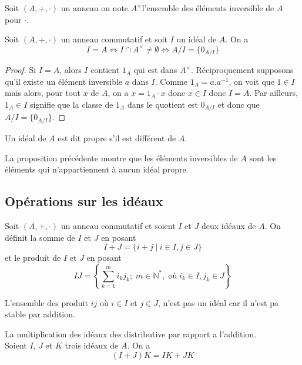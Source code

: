 Soit $(A,+,\cdot)$ un anneau on note $A^\times$l'ensemble des éléments inversible de $A$ pour $\cdot$.


    \begin{proposition}
        Soit $(A,+,\cdot)$ un anneau commutatif et soit $I$ un idéal de $A$. On a
        \[
        I=A \Leftrightarrow I\cap A^\times \neq \emptyset \Leftrightarrow A/I = \{0_{A/I}\}
        \]
    \end{proposition}
    


\begin{proof}
    Si $I=A$, alors $I$ contient $1_A$ qui est dans $A^\times$. Réciproquement supposons qu'il existe un élément inversible $a$ dans $I$. Comme $1_A=a.a^{-1}$, on voit que $1\in I$ mais alors, pour tout $x$ de $A$, on a $x=1_A\cdot x$ donc $x \in I$ donc $I=A$. Par ailleurs, $1_A\in I$ signifie que la classe de $1_A$ dans le quotient est $0_{A/I}$ et donc que $A/I=\{0_{A/I}\}$.
\end{proof}

\begin{definition}
    Un idéal de $A$ est dit propre s'il est différent de $A$.
\end{definition}
La proposition précédente montre que les éléments inversibles de $A$ sont les éléments qui n'appartiennent à aucun idéal propre.
\subsection{Opérations sur les idéaux}

    \begin{definition}
        Soit $(A,+,\cdot)$ un anneau commutatif et soient $I$ et $J$ deux idéaux de $A$. On définit la somme de $I$ et $J$ en posant 
        \[
        I+J=\{i+j\; |\:  i \in I, j\in J\}
        \]
        et le produit de $I$ et $J$ en posant
        \[
        IJ= \left\{\sum_{k=1}^m i_kj_k; \;m\in \mathbb{N}^*,\; \text{où}\; i_k\in I, j_k \in J \right\}
        \]
    \end{definition}
    
    \begin{remarque}
        L'ensemble des produit $ij$ où $i\in I$ et $j\in J$, n'est pas un idéal car il n'est pa stable par addition.
    \end{remarque}
   
        \begin{proposition}
            La multiplication des idéaux des distributive par rapport a l'addition.\\
            Soient $I$, $J$ et $K$ trois idéaux de $A$. On a
            \[
            (I+J)K=IK+JK
            \]
            \end{proposition}

